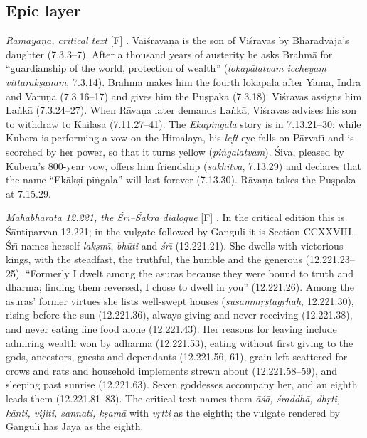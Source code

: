 \documentclass[journal]{IEEEtran}
\theoremstyle{definition}
\newcommand{\Fact}{\textsf{[F]}}
\begin{document}
\subsection{Epic layer}
\emph{R\=am\=aya\d na, critical text} \Fact{} \cite{gretil_ramayana}. Vai\'srava\d na is the son of Vi\'sravas by Bharadv\=aja's daughter (7.3.3--7). After a thousand years of austerity he asks Brahm\=a for ``guardianship of the world, protection of wealth'' (\emph{lokap\=alatvam iccheya\d m vittarak\d sa\d nam}, 7.3.14). Brahm\=a makes him the fourth lokap\=ala after Yama, Indra and Varu\d na (7.3.16--17) and gives him the Pu\d spaka (7.3.18). Vi\'sravas assigns him La\.nk\=a (7.3.24--27). When R\=ava\d na later demands La\.nk\=a, Vi\'sravas advises his son to withdraw to Kail\=asa (7.11.27--41). The \emph{Ekapi\.ngala} story is in 7.13.21--30: while Kubera is performing a vow on the Himalaya, his \emph{left} eye falls on P\=arvat\=\i{} and is scorched by her power, so that it turns yellow (\emph{pi\.ngalatvam}). \'Siva, pleased by Kubera's 800-year vow, offers him friendship (\emph{sakhitva}, 7.13.29) and declares that the name ``Ek\=ak\d si-pi\.ngala'' will last forever (7.13.30). R\=ava\d na takes the Pu\d spaka at 7.15.29.

\emph{Mah\=abh\=arata 12.221, the \'Sr\=\i{}--\'Sakra dialogue} \Fact{} \cite{gretil_mbh12,roy_santi2}. In the critical edition this is \'S\=antiparvan 12.221; in the vulgate followed by Ganguli it is Section CCXXVIII. \'Sr\=\i{} names herself \emph{lak\d sm\=\i}, \emph{bh\=uti} and \emph{\'sr\=\i} (12.221.21). She dwells with victorious kings, with the steadfast, the truthful, the humble and the generous (12.221.23--25). ``Formerly I dwelt among the asuras because they were bound to truth and dharma; finding them reversed, I chose to dwell in you'' (12.221.26). Among the asuras' former virtues she lists well-swept houses (\emph{susa\d mm\d r\d s\d tag\d rh\=a\d h}, 12.221.30), rising before the sun (12.221.36), always giving and never receiving (12.221.38), and never eating fine food alone (12.221.43). Her reasons for leaving include admiring wealth won by adharma (12.221.53), eating without first giving to the gods, ancestors, guests and dependants (12.221.56, 61), grain left scattered for crows and rats and household implements strewn about (12.221.58--59), and sleeping past sunrise (12.221.63). Seven goddesses accompany her, and an eighth leads them (12.221.81--83). The critical text names them \emph{\=a\'s\=a, \'sraddh\=a, dh\d rti, k\=anti, vijiti, sannati, k\d sam\=a} with \emph{v\d rtti} as the eighth; the vulgate rendered by Ganguli has Jay\=a as the eighth.
\end{document}
